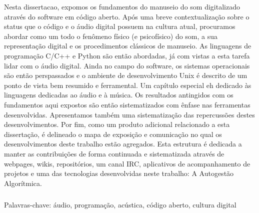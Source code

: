 \begin{resumo}

Nesta dissertacao, expomos os fundamentos do manuseio do som digitalizado através do software em código aberto.
Após uma breve contextualização sobre o status que o código e o áudio digital possuem na cultura atual, procuramos abordar como um todo o fenômeno
físico (e psicofísico) do som, a sua representação digital e os procedimentos clássicos de manuseio. As linguagens de programação C/C++ e Python
são então abordadas, já com vistas a esta tarefa lidar com o áudio digital. Ainda no campo do software,
os sistemas operacionais são então perspassados e o ambiente de desenvolvimento Unix é descrito de um ponto
de vista bem resumido e ferramental. Um capítulo especial eh dedicado às linguagens dedicadas ao áudio e à música.
Os resultados antingidos com os fundamentos aqui expostos são então sistematizados com ênfase nas ferramentas desenvolvidas.
Apresentamos também uma sistematização das repercussões destes desenvolvimentos.
Por fim, como um produto adicional relacionado a esta dissertação, é delineado o mapa de exposição e comunicação no qual
os desenvolvimentos deste trabalho estão agregados. Esta estrutura é dedicada a manter as contribuições
de forma continuada e sistematizada através de webpages, wikis, repositórios, um canal IRC, aplicativos de acompanhamento de projetos
e uma das tecnologias desenvolvidas neste trabalho: A Autogestão Algorítmica.


$\phantom{linha em branco}$\\
Palavras-chave: áudio, programação, acústica, código aberto, cultura digital

\end{resumo}


